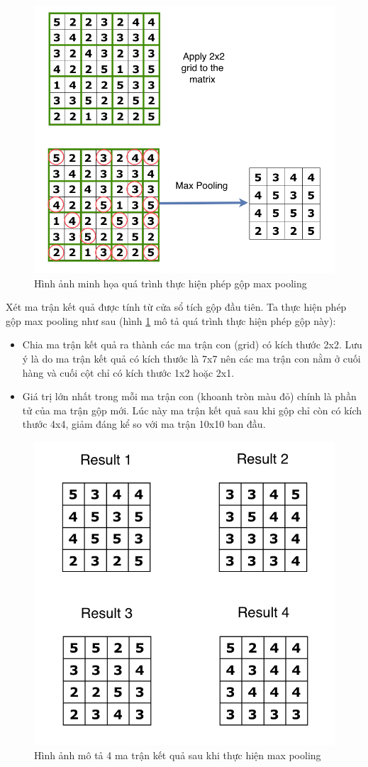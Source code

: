 \begin{figure}[!h]
	\centering
		\includegraphics[width=0.8\columnwidth]{books/artificial-neural-network/chapter05/figure/max_pooling_example.png}
		\centering
	\caption{Hình ảnh minh họa quá trình thực hiện phép gộp max pooling}
	\label{fig:MaxPoolingExample}
\end{figure}

Xét ma trận kết quả được tính từ cửa sổ tích gộp đầu tiên. Ta thực hiện phép gộp max pooling như sau (hình \ref{fig:MaxPoolingExample} mô tả quá trình thực hiện phép gộp này):
\begin{itemize}
\item Chia ma trận kết quả ra thành các ma trận con (grid) có kích thước 2x2. Lưu ý là do ma trận kết quả có kích thước là 7x7 nên các ma trận con nằm ở cuối hàng và cuối cột chỉ có kích thước 1x2 hoặc 2x1.
\item Giá trị lớn nhất trong mỗi ma trận con (khoanh tròn màu đỏ) chính là phần tử của ma trận gộp mới. Lúc này ma trận kết quả sau khi gộp chỉ còn có kích thước 4x4, giảm đáng kể so với ma trận 10x10 ban đầu.
\end{itemize}

\begin{figure}[!h]
	\centering
		\includegraphics[width=0.6\columnwidth]{books/artificial-neural-network/chapter05/figure/max_pooling_results.png}
		\centering
	\caption{Hình ảnh mô tả 4 ma trận kết quả sau khi thực hiện max pooling}
	\label{fig:MaxPoolingResults}
\end{figure}

